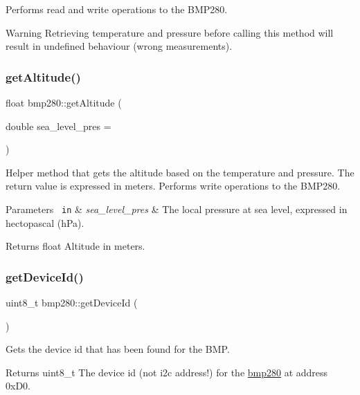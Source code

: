 Performs read and write operations to the B\+M\+P280. \begin{DoxyWarning}{Warning}
Retrieving temperature and pressure before calling this method will result in undefined behaviour (wrong measurements). 
\end{DoxyWarning}
\mbox{\label{classbmp280_a9f477a87343ddd8a49cdd88210bd80cb}} 
\subsubsection{\texorpdfstring{getAltitude()}{getAltitude()}}
{\footnotesize\ttfamily float bmp280\+::get\+Altitude (\begin{DoxyParamCaption}\item[{double}]{sea\+\_\+level\+\_\+pres = {} }\end{DoxyParamCaption})}



Helper method that gets the altitude based on the temperature and pressure. The return value is expressed in meters. Performs write operations to the B\+M\+P280. 


\begin{DoxyParams}[1]{Parameters}
\mbox{\texttt{ in}}  & {\em sea\+\_\+level\+\_\+pres} & The local pressure at sea level, expressed in hectopascal (h\+Pa). \\
\hline
\end{DoxyParams}
\begin{DoxyReturn}{Returns}
float Altitude in meters. 
\end{DoxyReturn}
\mbox{\label{classbmp280_ace425e5f5d6fa925613421a75dd54fef}} 
\subsubsection{\texorpdfstring{getDeviceId()}{getDeviceId()}}
{\footnotesize\ttfamily uint8\+\_\+t bmp280\+::get\+Device\+Id (\begin{DoxyParamCaption}{ }\end{DoxyParamCaption})}



Gets the device id that has been found for the B\+MP. 

\begin{DoxyReturn}{Returns}
uint8\+\_\+t The device id (not i2c address!) for the \mbox{\hyperlink{classbmp280}{bmp280}} at address 0x\+D0. 
\end{DoxyReturn}
\mbox{\label{classbmp280_ab463411af32432506c42768cdf73f5f2}} 
